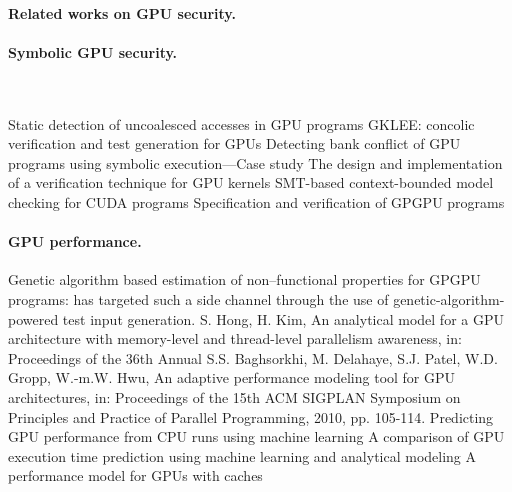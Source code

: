 \paragraph{Related works on GPU security.}

\paragraph{Symbolic GPU security.}
~\cite{horga2022JSA}

Static detection of uncoalesced accesses in GPU programs
GKLEE: concolic verification and test generation for GPUs
Detecting bank conflict of GPU programs using symbolic execution—Case study
The design and implementation of a verification technique for GPU kernels
SMT-based context-bounded model checking for CUDA programs
Specification and verification of GPGPU programs


\paragraph{GPU performance.}
Genetic algorithm based estimation of non–functional properties for GPGPU programs: has targeted such a side channel through the use of genetic-algorithm-powered test input generation.
S. Hong, H. Kim, An analytical model for a GPU architecture with memory-level and thread-level parallelism awareness, in: Proceedings of the 36th Annual
S.S. Baghsorkhi, M. Delahaye, S.J. Patel, W.D. Gropp, W.-m.W. Hwu, An adaptive performance modeling tool for GPU architectures, in: Proceedings of the 15th ACM SIGPLAN Symposium on Principles and Practice of Parallel Programming, 2010, pp. 105-114.
Predicting GPU performance from CPU runs using machine learning
A comparison of GPU execution time prediction using machine learning and analytical modeling
A performance model for GPUs with caches



